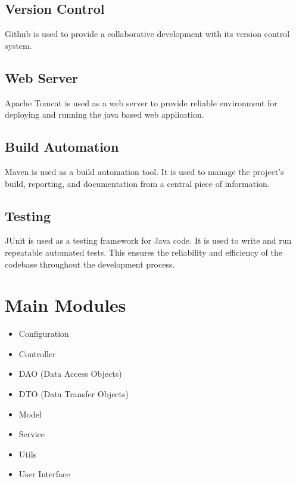 \subsection*{Version Control} Github is used to provide a collaborative development with its version control system.

\subsection*{Web Server} Apache Tomcat is used as a web server to provide reliable environment for deploying and running the java based web application.

\subsection*{Build Automation} Maven is used as a build automation tool. It is used to manage the project's build, reporting, and documentation from a central piece of information.

\subsection*{Testing}JUnit is used as a testing framework for Java code. It is used to write and run repeatable automated tests. This ensures the reliability and efficiency of the codebase throughout the development process.





\section{Main Modules}
\begin{itemize}
    \item Configuration
    \item Controller
    \item DAO (Data Access Objects)
    \item DTO (Data Transfer Objects)
    \item Model 
    \item Service
    \item Utils
    \item User Interface
\end{itemize}
